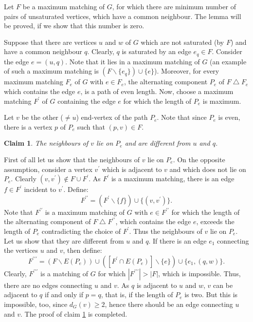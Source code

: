 \documentclass[fleqn,12pt,twoside]{article}
\newtheorem{claim}{Claim}
\newenvironment{proof}[1][Proof.]{\begin{trivlist}
\item[\hskip \labelsep {\bfseries #1}]}{\end{trivlist}}
\begin{document}
\begin{proof}
Let $F$ be a maximum matching of $G$, for which there are minimum
number of pairs of unsaturated vertices, which have a common
neighbour. The lemma will be proved, if we show that this number is
zero.

Suppose that there are vertices $u$ and $w$ of $G$ which are not
saturated (by $F$) and have a common neighbour $q$. Clearly, $q$ is
saturated by an edge $e_q\in F$. Consider the edge $e=(u,q)$. Note
that it lies in a maximum matching of $G$ (an example of such a
maximum matching is $(F\backslash \{e_q\})\cup \{e\}$). Moreover,
for every maximum matching $F_{e}$
of $G$ with $e\in F_{e}$, the alternating component $P_{e}$ of $F\bigtriangleup F_{e}$ which contains the edge $e$, is a path of
even length. Now, choose a maximum matching $F^{\prime }$ of $G$
containing the edge $e$ for which the length of $P_{e}$ is maximum.

Let $v$ be the other ($\neq u$) end-vertex of the path $P_{e}$. Note
that since $P_{e}$ is even, there is a vertex $p$ of $P_{e}$ such that $(p,v)\in F$.

\begin{claim}
\label{Neighbours V}The neighbours of $v$ lie on $P_{e}$ and are
different from $u$ and $q$.
\end{claim}

\begin{proof}
First of all let us show that the neighbours of $v$ lie on $P_{e}$.
On the opposite assumption, consider a vertex $v^{\prime }$ which is
adjacent to $v$ and which does not lie on $P_{e}$. Clearly
$(v,v^{\prime })\notin F\cup F^{\prime }$. As $F^{\prime }$ is a
maximum matching, there is an edge $f\in F^{\prime }$ incident to
$v^{\prime }$. Define:
\begin{equation*}
F^{\prime \prime }=(F^{\prime }\backslash \{f\})\cup \{(v,v^{\prime
})\}.
\end{equation*}Note that $F^{\prime \prime }$ is a maximum matching of $G$ with
$e\in
F^{\prime \prime }$ for which the length of the alternating component of $F\bigtriangleup F^{\prime \prime }$, which contains the edge $e$,
exceeds the length of $P_{e}$ contradicting the choice of $F^{\prime
}$. Thus the
neighbours of $v$ lie on $P_{e}$. Let us show that they are different from $u $ and $q$. If there is an edge $e_{1}$ connecting the vertices $u$ and $v$, then define:
\begin{equation*}
F^{\prime \prime \prime }=(F\backslash E(P_{e}))\cup ([F^{\prime
}\cap E(P_{e})]\backslash \{e\})\cup \{e_{1},(q,w)\}.
\end{equation*}Clearly, $F^{\prime \prime \prime }$ is a matching of $G$ for which $\left\vert F^{\prime \prime \prime }\right\vert >\left\vert
F\right\vert $,
which is impossible. Thus, there are no edges connecting $u$ and $v$. As $q$ is adjacent to $u$ and $w$, $v$ can be adjacent to $q$ if and
only if $p=q$, that is, if the length of $P_{e}$ is two. But this is
impossible, too, since $d_{G}(v)\geq 2$, hence there should be an
edge connecting $u$ and $v$. The proof of claim \ref{Neighbours V}
is completed.
\end{proof}


\end{proof}
\end{document}
